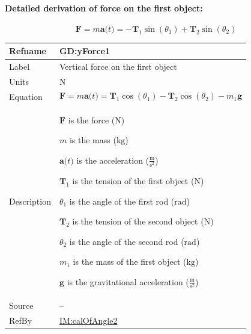 \documentclass[12pt]{article}
\begin{document}
\paragraph{Detailed derivation of force on the first object:}
\label{GD:xForce1Deriv}
\begin{displaymath}
\symbf{F}=m \symbf{a}\text{(}t\text{)}=-{\symbf{T}_{1}} \sin\left({θ_{1}}\right)+{\symbf{T}_{2}} \sin\left({θ_{2}}\right)
\end{displaymath}
\vspace{\baselineskip}
\noindent
\begin{minipage}{\textwidth}
\begin{tabular}{>{\raggedright}p{}>{\raggedright\arraybackslash}p{}}
\toprule \textbf{Refname} & \textbf{GD:yForce1}
\label{GD:yForce1}
\\ \midrule
Label & Vertical force on the first object
        
\\ \midrule
Units & ${\text{N}}$
        
\\ \midrule
Equation & \begin{displaymath}
           \symbf{F}=m \symbf{a}\text{(}t\text{)}={\symbf{T}_{1}} \cos\left({θ_{1}}\right)-{\symbf{T}_{2}} \cos\left({θ_{2}}\right)-{m_{1}} \symbf{g}
           \end{displaymath}
\\ \midrule
Description & \begin{symbDescription}
              \item{$\symbf{F}$ is the force (${\text{N}}$)}
              \item{$m$ is the mass (${\text{kg}}$)}
              \item{$\symbf{a}\text{(}t\text{)}$ is the acceleration ($\frac{\text{m}}{\text{s}^{2}}$)}
              \item{${\symbf{T}_{1}}$ is the tension of the first object (${\text{N}}$)}
              \item{${θ_{1}}$ is the angle of the first rod (${\text{rad}}$)}
              \item{${\symbf{T}_{2}}$ is the tension of the second object (${\text{N}}$)}
              \item{${θ_{2}}$ is the angle of the second rod (${\text{rad}}$)}
              \item{${m_{1}}$ is the mass of the first object (${\text{kg}}$)}
              \item{$\symbf{g}$ is the gravitational acceleration ($\frac{\text{m}}{\text{s}^{2}}$)}
              \end{symbDescription}
\\ \midrule
Source & --
         
\\ \midrule
RefBy & \hyperref[IM:calOfAngle2]{IM:calOfAngle2}
        
\\ \bottomrule
\end{tabular}
\end{minipage}
\end{document}
